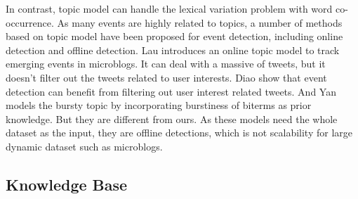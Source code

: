 \documentclass[conference,compsoc]{IEEEtran}
\begin{document}
In contrast, topic model can handle the lexical variation problem with word co-occurrence\cite{blei2003latent}.
As many events are highly related to topics, a number of methods based on topic model have been proposed for event detection, including online detection and offline detection.
Lau\cite{lau2012line} introduces an online topic model to track emerging events in microblogs.
It can deal with a massive of tweets, but it doesn't filter out the tweets related to user interests.
Diao\cite{timeUserLDA2012finding}\cite{diao2013unified} show that event detection can benefit from filtering out user interest related tweets. 
And Yan\cite{Yan:2015wm} models the bursty topic by incorporating burstiness of biterms as prior knowledge.
But they are different from ours.
As these models need the whole dataset as the input, they are offline detections, which is not scalability for large dynamic dataset such as microblogs.
\subsection{Knowledge Base}


\end{document}
